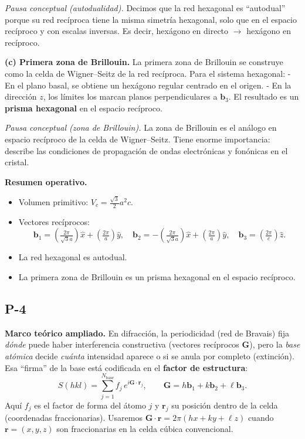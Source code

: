 \documentclass{article}
\begin{document}
\medskip
\noindent\textit{Pausa conceptual (autodualidad).}  
Decimos que la red hexagonal es “autodual” porque su red recíproca tiene la misma simetría hexagonal, solo que en el espacio recíproco y con escalas inversas. Es decir, hexágono en directo \(\to\) hexágono en recíproco.

\bigskip
\textbf{(c) Primera zona de Brillouin.}  
La primera zona de Brillouin se construye como la celda de Wigner–Seitz de la red recíproca. Para el sistema hexagonal:
- En el plano basal, se obtiene un hexágono regular centrado en el origen.  
- En la dirección \(z\), los límites los marcan planos perpendiculares a \(\mathbf{b}_3\).  
El resultado es un \textbf{prisma hexagonal} en el espacio recíproco.

\medskip
\noindent\textit{Pausa conceptual (zona de Brillouin).}  
La zona de Brillouin es el análogo en espacio recíproco de la celda de Wigner–Seitz. Tiene enorme importancia: describe las condiciones de propagación de ondas electrónicas y fonónicas en el cristal.

\bigskip
\textbf{Resumen operativo.}
\begin{itemize}
\item Volumen primitivo: \(V_c = \tfrac{\sqrt{3}}{2}a^2c\).  
\item Vectores recíprocos:
\[
\mathbf{b}_1 = \left(\tfrac{2\pi}{\sqrt{3}a}\right)\hat{x} + \left(\tfrac{2\pi}{a}\right)\hat{y}, \quad
\mathbf{b}_2 = -\left(\tfrac{2\pi}{\sqrt{3}a}\right)\hat{x} + \left(\tfrac{2\pi}{a}\right)\hat{y}, \quad
\mathbf{b}_3 = \left(\tfrac{2\pi}{c}\right)\hat{z}.
\]
\item La red hexagonal es autodual.  
\item La primera zona de Brillouin es un prisma hexagonal en el espacio recíproco.  
\end{itemize}


\subsection{P-4}

\textbf{Marco teórico ampliado.}  
En difracción, la periodicidad (red de Bravais) fija \emph{dónde} puede haber interferencia constructiva (vectores recíprocos \(\mathbf{G}\)), pero la \emph{base atómica} decide \emph{cuánta} intensidad aparece o si se anula por completo (extinción).  
Esa “firma” de la base está codificada en el \textbf{factor de estructura}:
\[
S(hkl)=\sum_{j=1}^{N_\text{base}} f_j\,e^{i\mathbf{G}\cdot \mathbf{r}_j},
\qquad \mathbf{G}=h\mathbf{b}_1+k\mathbf{b}_2+\ell\mathbf{b}_3.
\]
Aquí \(f_j\) es el factor de forma del átomo \(j\) y \(\mathbf{r}_j\) su posición dentro de la celda (coordenadas fraccionarias).  
Usaremos \(\mathbf{G}\cdot \mathbf{r}=2\pi(hx+ky+\ell z)\) cuando \(\mathbf{r}=(x,y,z)\) son fraccionarias en la celda cúbica convencional.
\end{document}
